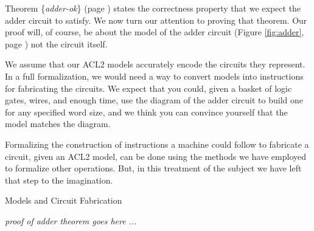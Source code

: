 Theorem \{\emph{adder-ok}\} (page \pageref{fig:adder-schematic})
states the correctness property that
we expect the adder circuit to satisfy.
We now turn our attention to proving that theorem.
Our proof will, of course, be about the model of the adder circuit
(Figure \ref{fig:adder}, page \pageref{fig:adder})
not the circuit itself.

\begin{aside}
We assume that our ACL2 models
accurately encode the circuits they represent.
In a full formalization, we would
need a way to convert models into instructions
for fabricating the circuits.
We expect that you could, given a basket of
logic gates, wires, and enough time,
use the diagram of the adder circuit to
build one for any specified word size,
and we think you can convince yourself that the model
matches the diagram.

Formalizing the construction of instructions a machine could
follow to fabricate a circuit, given an ACL2 model,
can be done using the methods
we have employed to formalize other operations.
But, in this treatment of the subject
we have left that step to the imagination.
\caption{Models and Circuit Fabrication}
\label{circuit-vs-model}
\end{aside}

\vspace{1mm}
\textit{proof of adder theorem goes here ...}

